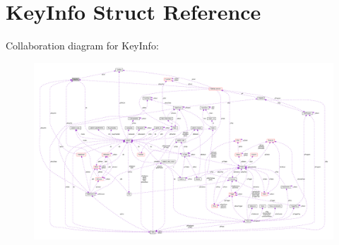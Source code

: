 \hypertarget{structKeyInfo}{}\section{Key\+Info Struct Reference}
\label{structKeyInfo}


Collaboration diagram for Key\+Info\+:\nopagebreak
\begin{figure}[H]
\begin{center}
\leavevmode
\includegraphics[width=350pt]{structKeyInfo__coll__graph}
\end{center}
\end{figure}

